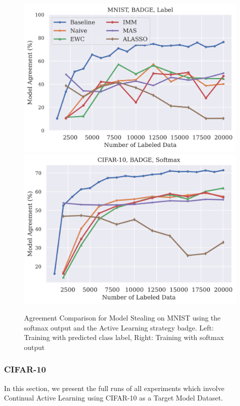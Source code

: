 \begin{figure}[!htb]
    \centering
    \includegraphics[width=0.48\linewidth]{images/results_CALMS/mnist_label_badge.png} \hfill
    \includegraphics[width=0.48\linewidth]{images/results_CALMS/cifar_softmax_badge.png}
    \caption{Agreement Comparison for Model Stealing on MNIST using the softmax output and the Active Learning strategy \gls{badge}. Left: Training with predicted class label,
    Right: Training with softmax output}
    \label{fig:CALMSMNISTBadge}
\end{figure}

\clearpage

\subsubsection{CIFAR-10}
\label{sec:Appendix:CALMS:CIFAR}
In this section, we present the full runs of all experiments which involve Continual Active Learning using CIFAR-10 as a Target Model Dataset.

